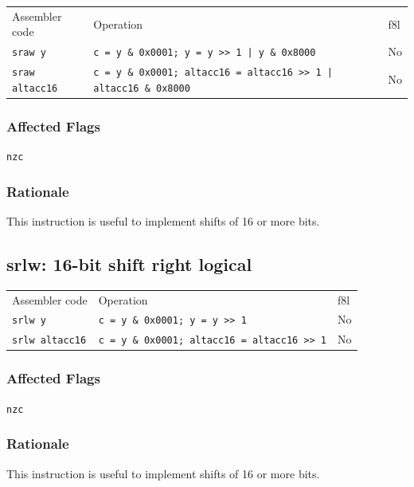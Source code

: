 \documentclass{book}
\begin{document}
\begin{tabular}{l l l}
Assembler code         & Operation                                                               & f8l \\
\texttt{sraw y}        & \texttt{c = y \& 0x0001; y = y >> 1 | y \& 0x8000}                      & No \\
\texttt{sraw altacc16} & \texttt{c = y \& 0x0001; altacc16 = altacc16 >> 1 | altacc16 \& 0x8000} & No \\
\end{tabular}

\subsubsection*{Affected Flags}

\texttt{nzc}

\subsubsection*{Rationale}

This instruction is useful to implement shifts of 16 or more bits.


\subsection{srlw: 16-bit shift right logical}

\begin{tabular}{l l l}
Assembler code         & Operation                                          & f8l \\
\texttt{srlw y}        & \texttt{c = y \& 0x0001; y = y >> 1}               & No \\
\texttt{srlw altacc16} & \texttt{c = y \& 0x0001; altacc16 = altacc16 >> 1} & No \\
\end{tabular}

\subsubsection*{Affected Flags}

\texttt{nzc}

\subsubsection*{Rationale}

This instruction is useful to implement shifts of 16 or more bits.
\end{document}
